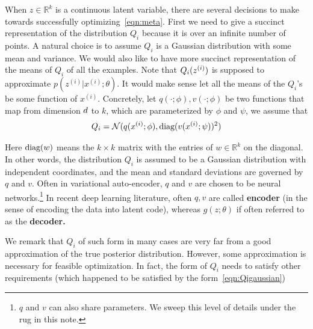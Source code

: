 \documentclass{article}
\begin{document}
When $z\in \mathbb{R}^k$ is a continuous latent variable, there are several decisions to make towards successfully optimizing~\eqref{eqn:meta}. First we need to give a succinct representation of the distribution $Q_i$ because it is over an infinite number of points. A natural choice is to assume $Q_i$ is a Gaussian distribution with some mean and variance. We would also like to have more succinct representation of the means of $Q_i$ of all the examples. %
Note that $Q_i({z^{(i)}})$ is supposed to approximate $p(z^{(i)} | x^{(i)}; \theta)$. It would make sense let all the means of the $Q_i$'s be some function of $x^{(i)}$. Concretely, let $q(\cdot;\phi), v(\cdot; \phi)$ be two functions that map from dimension ${d}$ to $k$, which are parameterized by $\phi$ and $\psi$, we assume that 
\begin{align}
Q_i = \mathcal{N}(q({x^{(i)}};\phi), \textup{diag}(v({x^{(i)}};\psi))^2)\label{eqn:Qigaussian}
\end{align}

Here $\textup{diag}(w)$ means the $k\times k$ matrix with the entries of $w\in \mathbb{R}^k$ on the diagonal. In other words, the distribution $Q_i$ is assumed to be a Gaussian distribution with independent coordinates, and the mean and standard deviations are governed by $q$ and $v$. Often in variational auto-encoder, $q$ and $v$ are chosen to be neural networks.\footnote{$q$ and $v$ can also share parameters.  We sweep this level of details under the rug in this note.} In recent deep learning literature, often $q, v$ are called {\bf encoder} (in the sense of encoding the data into latent code), whereas $g(z;\theta)$ if often referred to as the {\bf decoder.}


We remark that $Q_i$ of such form in many cases are very far from a good approximation of the true posterior distribution. However, some approximation is necessary for feasible optimization. In fact, the form of $Q_i$ needs to satisfy other requirements (which happened to be satisfied by the form~\eqref{eqn:Qigaussian}) 
\end{document}
